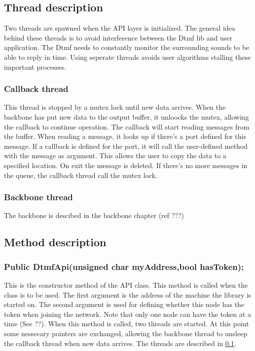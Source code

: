 \subsection{Thread description}
\label{api_thread_description}
Two threads are spawned when the API layer is initialized. The general idea behind these threads is to avoid interference between the Dtmf lib and user application. The Dtmf needs to constantly monitor the surrounding sounds to be able to reply in time. Using seperate threads avoids user algorithms stalling these important processes.

\subsubsection{Callback thread}
This thread is stopped by a mutex lock until new data arrives. When the backbone has put new data to the output buffer, it unloocks the mutex, allowing the callback to continue operation. The callback will start reading messages from the buffer. When reading a message, it looks up if there's a port defined for this message. If a callback is defined for the port, it will call the user-defined method with the message as argument. This allows the user to copy the data to a specified location. On exit the message is deleted. If there's no more messages in the queue, the callback thread call the mutex lock.

\subsubsection{Backbone thread}
The backbone is descibed in the backbone chapter (ref ???)

\subsection{Method description}\label{sub:api_method_description}
\subsubsection*{Public DtmfApi(unsigned char myAddress,bool hasToken);}
This is the constructor method of the API class. This method is called when the class is to be used. The first argument is the address of the machine the library is started on. The second argument is used for defining whether this node has the token when joining the network. Note that only one node can have the token at a time (See ??). When this method is called, two threads are started. At this point some nessecary pointers are exchanged, allowing the backbone thread to unsleep the callback thread when new data arrives. The threads are described in \ref{api_thread_description}.

